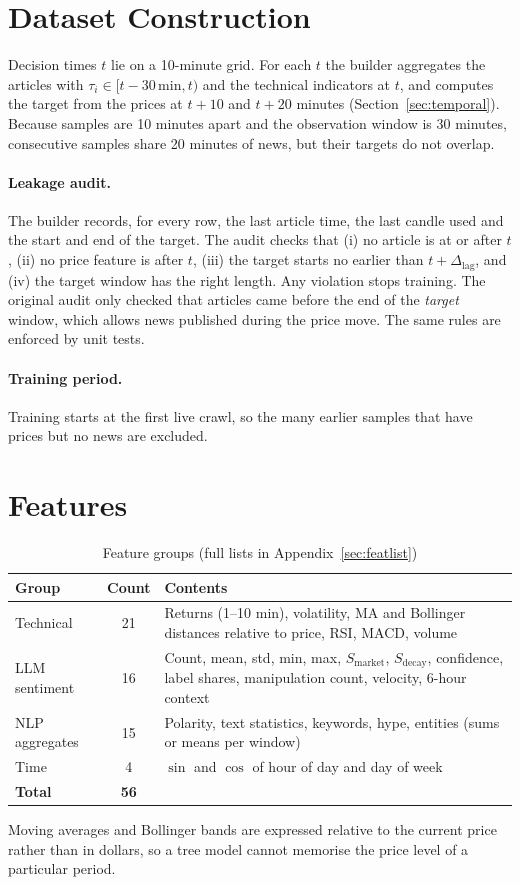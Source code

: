 \documentclass[12pt,a4paper,oneside]{report}
\newcommand{\dlag}{\Delta_{\mathrm{lag}}}
\begin{document}
\section{Dataset Construction}\label{sec:dataset}
Decision times $t$ lie on a 10-minute grid. For each $t$ the builder
aggregates the articles with $\tau_i \in [t-30\,\mathrm{min}, t)$ and the
technical indicators at $t$, and computes the target from the prices at
$t+10$ and $t+20$ minutes (Section~\ref{sec:temporal}). Because samples are
10 minutes apart and the observation window is 30 minutes, consecutive
samples share 20 minutes of news, but their targets do not overlap.

\paragraph{Leakage audit.} The builder records, for every row, the last
article time, the last candle used and the start and end of the target. The
audit checks that (i) no article is at or after $t$, (ii) no price feature
is after $t$, (iii) the target starts no earlier than $t+\dlag$, and (iv) the
target window has the right length. Any violation stops training. The
original audit only checked that articles came before the end of the
\emph{target} window, which allows news published during the price move.
The same rules are enforced by unit tests.

\paragraph{Training period.} Training starts at the first live crawl, so
the many earlier samples that have prices but no news are excluded.

\section{Features}\label{sec:features}
\begin{table}[H]
\centering
\caption{Feature groups (full lists in Appendix~\ref{sec:featlist})}
\label{tab:featgroups}
\begin{tabularx}{\linewidth}{lcY}
  \toprule
  \textbf{Group} & \textbf{Count} & \textbf{Contents} \\
  \midrule
  Technical & 21 & Returns (1--10 min), volatility, MA and Bollinger distances relative to price, RSI, MACD, volume \\
  LLM sentiment & 16 & Count, mean, std, min, max, $S_{\mathrm{market}}$, $S_{\mathrm{decay}}$, confidence, label shares, manipulation count, velocity, 6-hour context \\
  NLP aggregates & 15 & Polarity, text statistics, keywords, hype, entities (sums or means per window) \\
  Time & 4 & $\sin$ and $\cos$ of hour of day and day of week \\
  \midrule
  \textbf{Total} & \textbf{56} & \\
  \bottomrule
\end{tabularx}
\end{table}
Moving averages and Bollinger bands are expressed relative to the current
price rather than in dollars, so a tree model cannot memorise the price
level of a particular period.
\end{document}
